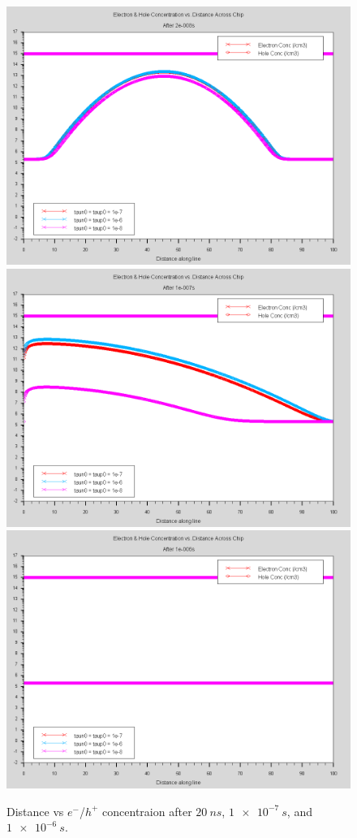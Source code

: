 \documentclass[12pt]{article}
\begin{document}
\begin{figure}[htp]
  \centering
  \includegraphics[width=.3\textwidth]{lifetime_after2e-008s}\hfill
  \includegraphics[width=.3\textwidth]{lifetime_after1e-007s}\hfill
  \includegraphics[width=.3\textwidth]{lifetime_after1e-006s}
  \caption{Distance vs $e^-$/$h^+$ concentraion after $\SI{20}{ns}$, $\SI{1e-7}{s}$, and $\SI{1e-6}{s}$.}
  \label{fig:distancevcurrent_lifetime}
\end{figure}



\end{document}
